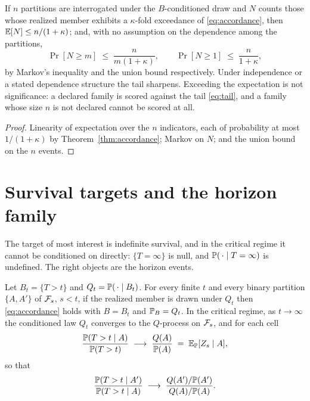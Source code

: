 \begin{proposition}
\label{prop:guard}
If $n$ partitions are interrogated under the $B$-conditioned draw and
$N$ counts those whose realized member exhibits a $\kappa$-fold
exceedance of \eqref{eq:accordance}, then $\mathbb{E}[N]\le n/(1+\kappa)$; and,
with no assumption on the dependence among the partitions,
\begin{equation}\label{eq:tail}
\Pr[N\ge m]\;\le\;\frac{n}{m(1+\kappa)},\qquad
\Pr[N\ge1]\;\le\;\frac{n}{1+\kappa},
\end{equation}
by Markov's inequality and the union bound respectively. Under
independence or a stated dependence structure the tail sharpens.
Exceeding the expectation is not significance: a declared family is
scored against the tail \eqref{eq:tail}, and a family whose size $n$ is
not declared cannot be scored at all.
\end{proposition}

\begin{proof}
Linearity of expectation over the $n$ indicators, each of probability
at most $1/(1+\kappa)$ by Theorem~\ref{thm:accordance}; Markov on $N$;
and the union bound on the $n$ events.
\end{proof}

\section{Survival targets and the horizon family}\label{sec:survival}

The target of most interest is indefinite survival, and in the critical
regime it cannot be conditioned on directly: $\{T=\infty\}$ is null, and
$\mathbb{P}(\,\cdot\mid T=\infty)$ is undefined. The right objects are the
horizon events.

\begin{theorem}\label{thm:horizon}
Let $B_t=\{T>t\}$ and $Q_t=\mathbb{P}(\,\cdot\mid B_t)$. For every finite $t$ and
every binary partition $\{A,A'\}$ of $\mathcal{F}_s$, $s<t$, if the realized member
is drawn under $Q_t$ then \eqref{eq:accordance} holds with $B=B_t$ and
$\mathbb{P}_B=Q_t$. In the critical regime, as $t\to\infty$ the conditioned law
$Q_t$ converges to the $Q$-process on $\mathcal{F}_s$, and for each cell
\begin{equation}\label{eq:cellconv}
\frac{\mathbb{P}(T>t\mid A)}{\mathbb{P}(T>t)}\;\longrightarrow\;\frac{Q(A)}{\mathbb{P}(A)}
\;=\;\mathbb{E}_{\mathbb{P}}[Z_s\mid A],
\end{equation}
so that
\begin{equation}\label{eq:ratioconv}
\frac{\mathbb{P}(T>t\mid A')}{\mathbb{P}(T>t\mid A)}\;\longrightarrow\;
\frac{Q(A')/\mathbb{P}(A')}{Q(A)/\mathbb{P}(A)}.
\end{equation}
\end{theorem}

